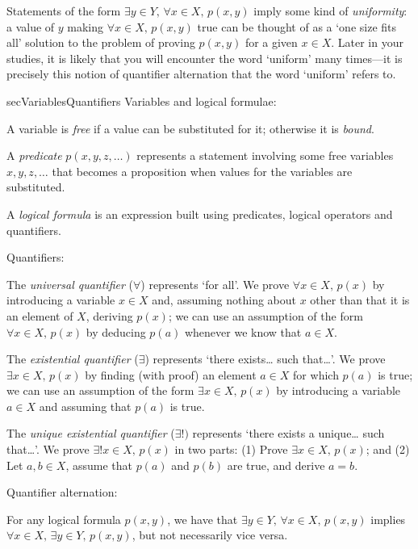 Statements of the form $\exists y \in Y,\, \forall x \in X,\, p(x,y)$ imply some kind of \textit{uniformity}: a value of $y$ making $\forall x \in X,\, p(x,y)$ true can be thought of as a `one size fits all' solution to the problem of proving $p(x,y)$ for a given $x \in X$. Later in your studies, it is likely that you will encounter the word `uniform' many times---it is precisely this notion of quantifier alternation that the word `uniform' refers to.

\begin{tldr}{secVariablesQuantifiers}
Variables and logical formulae:

\begin{tldrlist}
A variable is \textit{free} if a value can be substituted for it; otherwise it is \textit{bound}.

A \textit{predicate} $p(x,y,z,\dots)$ represents a statement involving some free variables $x,y,z,\dots{}$ that becomes a proposition when values for the variables are substituted.

A \textit{logical formula} is an expression built using predicates, logical operators and quantifiers.
\end{tldrlist}

Quantifiers:

\begin{tldrlist}
The \textit{universal quantifier} ($\forall$) represents `for all'. We prove $\forall x \in X,\, p(x)$ by introducing a variable $x \in X$ and, assuming nothing about $x$ other than that it is an element of $X$, deriving $p(x)$; we can use an assumption of the form $\forall x \in X,\, p(x)$ by deducing $p(a)$ whenever we know that $a \in X$.

The \textit{existential quantifier} ($\exists$) represents `there exists\dots{} such that\dots{}'. We prove $\exists x \in X,\, p(x)$ by finding (with proof) an element $a \in X$ for which $p(a)$ is true; we can use an assumption of the form $\exists x \in X,\, p(x)$ by introducing a variable $a \in X$ and assuming that $p(a)$ is true.

The \textit{unique existential quantifier} ($\exists !)$ represents `there exists a unique\dots{} such that\dots{}'. We prove $\exists ! x \in X,\, p(x)$ in two parts: (1) Prove $\exists x \in X,\, p(x)$; and (2) Let $a,b \in X$, assume that $p(a)$ and $p(b)$ are true, and derive $a=b$.
\end{tldrlist}

Quantifier alternation:

\begin{tldrlist}
For any logical formula $p(x,y)$, we have that $\exists y \in Y,\, \forall x \in X,\, p(x,y)$ implies $\forall x \in X,\, \exists y \in Y,\, p(x,y)$, but not necessarily vice versa.
\end{tldrlist}

\end{tldr}